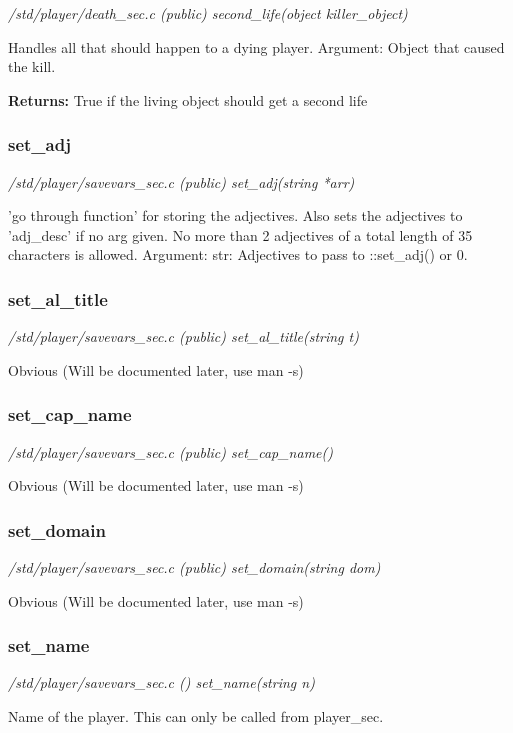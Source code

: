 {\em /std/player/death\_sec.c (public) second\_life(object killer\_object)}

Handles all that should happen to a dying player.
Argument:      Object that caused the kill.

{\bf Returns:}        True if the living object should get a second life


\subsubsection{set\_adj}

{\em /std/player/savevars\_sec.c (public) set\_adj(string *arr)}

'go through function' for storing the adjectives. Also
sets the adjectives to 'adj\_desc' if no arg given.
No more than 2 adjectives of a total length of 35
characters is allowed.
Argument:       str: Adjectives to pass to ::set\_adj() or 0.


\subsubsection{set\_al\_title}

{\em /std/player/savevars\_sec.c (public) set\_al\_title(string t)}

Obvious (Will be documented later, use man -s)


\subsubsection{set\_cap\_name}

{\em /std/player/savevars\_sec.c (public) set\_cap\_name()}

Obvious (Will be documented later, use man -s)


\subsubsection{set\_domain}

{\em /std/player/savevars\_sec.c (public) set\_domain(string dom)}

Obvious (Will be documented later, use man -s)


\subsubsection{set\_name}

{\em /std/player/savevars\_sec.c () set\_name(string n)}

Name of the player.
This can only be called from player\_sec.


